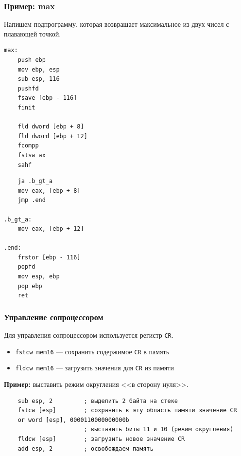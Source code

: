 \documentclass[utf8, russian, aspectratio=1610]{beamer}
\begin{document}
\begin{frame}[fragile]
    \frametitle{Пример: max}
    Напишем подпрограмму, которая возвращает максимальное из двух чисел с плавающей точкой.

\begin{minipage}[t]{0.45\linewidth}
\begin{verbatim}
max:
    push ebp
    mov ebp, esp
    sub esp, 116
    pushfd
    fsave [ebp - 116]
    finit

    fld dword [ebp + 8]
    fld dword [ebp + 12]
    fcompp
    fstsw ax
    sahf
\end{verbatim}
\end{minipage}
\begin{minipage}[t]{0.45\linewidth}
\begin{verbatim}
    ja .b_gt_a
    mov eax, [ebp + 8]
    jmp .end

.b_gt_a:
    mov eax, [ebp + 12]

.end: 
    frstor [ebp - 116]
    popfd
    mov esp, ebp
    pop ebp
    ret
\end{verbatim}
\end{minipage}

\end{frame}

\begin{frame}[fragile]
    \frametitle{Управление сопроцессором}

    Для управления сопроцессором используется регистр {\tt CR}.
    \begin{itemize}
        \item {\tt fstcw mem16} --- сохранить содержимое {\tt CR} в память
        \item {\tt fldcw mem16} --- загрузить значения для {\tt CR} из памяти
    \end{itemize}

    {\bf Пример:}  выставить режим округления <<в сторону нуля>>.
\begin{verbatim}
    sub esp, 2         ; выделить 2 байта на стеке
    fstcw [esp]        ; сохранить в эту область памяти значение CR
    or word [esp], 0000110000000000b
                       ; выставить биты 11 и 10 (режим округления)
    fldcw [esp]        ; загрузить новое значение CR
    add esp, 2         ; освобождаем память
\end{verbatim}
\end{frame}
\end{document}
